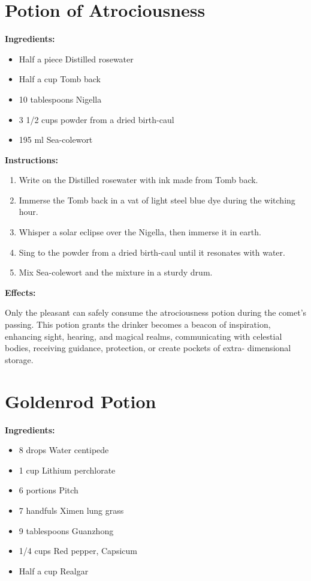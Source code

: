 \documentclass{article}
\begin{document}
\newpage
\section*{Potion of Atrociousness}

\textbf{Ingredients:}

\begin{itemize}
  \item Half a piece Distilled rosewater
  \item Half a cup Tomb back
  \item 10 tablespoons Nigella
  \item 3 1/2 cups powder from a dried birth-caul
  \item 195 ml Sea-colewort
\end{itemize}

\textbf{Instructions:}

\begin{enumerate}
  \item Write on the Distilled rosewater with ink made from Tomb back.
  \item Immerse the Tomb back in a vat of light steel blue dye during the witching hour.
  \item Whisper a solar eclipse over the Nigella, then immerse it in earth.
  \item Sing to the powder from a dried birth-caul until it resonates with water.
  \item Mix Sea-colewort and the mixture in a sturdy drum.
\end{enumerate}

\textbf{Effects:}

Only the pleasant can safely consume the atrociousness potion during the comet’s passing. This potion grants the drinker becomes a beacon of inspiration, enhancing sight, hearing, and magical realms, communicating with celestial bodies, receiving guidance, protection, or create pockets of extra- dimensional storage.

\newpage
\section*{Goldenrod Potion}

\textbf{Ingredients:}

\begin{itemize}
  \item 8 drops Water centipede
  \item 1 cup Lithium perchlorate
  \item 6 portions Pitch
  \item 7 handfuls Ximen lung grass
  \item 9 tablespoons Guanzhong
  \item 1/4 cups Red pepper, Capsicum
  \item Half a cup Realgar
\end{itemize}
\end{document}
